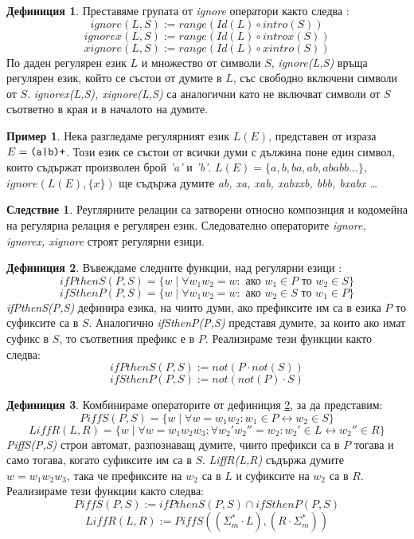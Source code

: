 \documentclass[12pt, oneside]{article}
\theoremstyle{definition}
\newtheorem{definition}{Дефиниция}[section]
\newtheorem{example}{Пример}[section]
\newtheorem{corollary}{Следствие}[section]
\begin{document}
\begin{definition}
	Преставяме групата от \emph{ignore} оператори както следва \cite{Kaplan&Kay:94}:
	\[ ignore(L,S) := range(Id(L) \circ intro(S)) \]
	\[ ignorex(L,S) := range(Id(L) \circ introx(S)) \]
	\[ xignore(L,S) := range(Id(L) \circ xintro(S)) \]
	По даден регулярен език \(L\) и множество от символи \(S\), \emph{ignore(L,S)} връща регулярен език, който се състои от думите в \(L\), със свободно включени символи от \(S\). \emph{ignorex(L,S), xignore(L,S)} са аналогични като не включват символи от \(S\) съответно в края и в началото на думите.	
\end{definition}

\begin{example}
	Нека разгледаме регулярният език \(L(E)\), представен от израза \( E = \verb/(a|b)+/ \). Този език се състои от всички думи с дължина поне един символ, които съдържат произволен брой \emph{'a'} и \emph{'b'}. \( L(E) = \{a, b, ba, ab, ababb \dots \} \), \( ignore(L(E), \{x\}) \) ще съдържа думите \emph{ab, xa, xab, xabxxb, bbb, bxabx \dots }
\end{example}

\begin{corollary}
	Реуглярните релации са затворени относно композиция и кодомейна на регулярна релация е регулярен език. Следователно операторите \emph{ignore, ignorex, xignore} строят регулярни езици.
\end{corollary}

\begin{definition}\label{def:defIfPThenS}
	Въвеждаме следните функции, над регулярни езици \cite{Kaplan&Kay:94}:
	\[ ifPthenS(P,S) = \{ w \mid \forall w_1w_2 = w: \text{ ако } w_1 \in P \text{ то } w_2 \in S \} \]
	\[ ifSthenP(P,S) = \{ w \mid \forall w_1w_2 = w: \text{ ако } w_2 \in S \text{ то } w_1 \in P \} \]
	\emph{ifPthenS(P,S)} дефинира езика, на чиито думи, ако префиксите им са в езика \(P\) то суфиксите са в \(S\). Аналогично \emph{ifSthenP(P,S)} представя думите, за които ако имат суфикс в \(S\), то съответния префикс е в \(P\). Реализираме тези функции както следва:
	\[ ifPthenS(P,S) := not(P \cdot not(S)) \]
	\[ ifSthenP(P,S) := not(not(P) \cdot S) \]	
\end{definition}

\begin{definition}
	Комбинираме операторите от дефиниция \ref{def:defIfPThenS}, за да представим:
	\[ PiffS(P,S) = \{ w \mid \forall w = w_1w_2: w_1 \in P \leftrightarrow w_2 \in S \} \]
	\[ LiffR(L,R) = \{ w \mid \forall w = w_1w_2w_3: \forall w_2'w_2'' = w_2: w_2' \in L \leftrightarrow w_2'' \in R \} \]
	\emph{PiffS(P,S)} строи автомат, разпознаващ думите, чиито префикси са в \(P\) тогава и само тогава, когато суфиксите им са в \(S\). \emph{LiffR(L,R)} съдържа думите \( w = w_1w_2w_3 \), така че префиксите на \(w_2\) са в \(L\) и суфиксите на \(w_2\) са в \(R\). Реализираме тези функции както следва:
	\[ PiffS(P,S) := ifPthenS(P,S) \cap ifSthenP(P,S) \]
	\[ LiffR(L,R) := PiffS((\Sigma_m^* \cdot L), (R \cdot \Sigma_m^*)) \]	
\end{definition}
\end{document}
